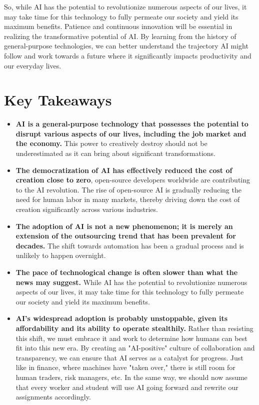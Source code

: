So, while AI has the potential to revolutionize numerous aspects of our lives, it may take time for this technology to fully permeate our society and yield its maximum benefits. Patience and continuous innovation will be essential in realizing the transformative potential of AI. By learning from the history of general-purpose technologies, we can better understand the trajectory AI might follow and work towards a future where it significantly impacts productivity and our everyday lives.

\section{Key Takeaways}

\begin{itemize}
\item \textbf{AI is a general-purpose technology that possesses the potential to disrupt various aspects of our lives, including the job market and the economy.} This power to creatively destroy should not be underestimated as it can bring about significant transformations.
\item \textbf{The democratization of AI has effectively reduced the cost of creation close to zero}, open-source developers worldwide are contributing to the AI revolution. The rise of open-source AI is gradually reducing the need for human labor in many markets, thereby driving down the cost of creation significantly across various industries.
\item \textbf{The adoption of AI is not a new phenomenon; it is merely an extension of the outsourcing trend that has been prevalent for decades.} The shift towards automation has been a gradual process and is unlikely to happen overnight.
\item \textbf{The pace of technological change is often slower than what the news may suggest.} While AI has the potential to revolutionize numerous aspects of our lives, it may take time for this technology to fully permeate our society and yield its maximum benefits.
\item \textbf{AI's widespread adoption is probably unstoppable, given its affordability and its ability to operate stealthily.} Rather than resisting this shift, we must embrace it and work to determine how humans can best fit into this new era. By creating an "AI-positive" culture of collaboration and transparency, we can ensure that AI serves as a catalyst for progress. Just like in finance, where machines have "taken over," there is still room for human traders, risk managers, etc. In the same way, we should now assume that every worker and student will use AI going forward and rewrite our assignments accordingly.
\end{itemize}
